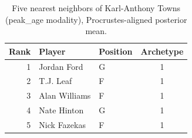 \begin{table}[htbp]
  \centering\small
  \begin{tabular}{rllc}
    \toprule
    Rank & Player & Position & Archetype \\
    \midrule
    1 & Jordan Ford & G & 1 \\
    2 & T.J. Leaf & F & 1 \\
    3 & Alan Williams & F & 1 \\
    4 & Nate Hinton & G & 1 \\
    5 & Nick Fazekas & F & 1 \\
    \bottomrule
  \end{tabular}
  \caption{Five nearest neighbors of Karl-Anthony Towns (peak_age modality), Procrustes-aligned posterior mean.}
  \label{tab:Karl_Anthony_Towns_neighbors_peak_age}
\end{table}

